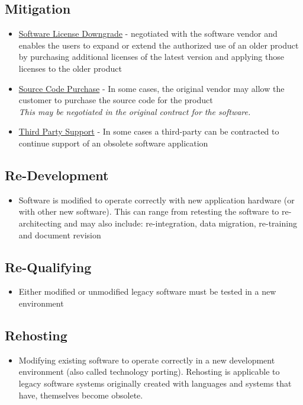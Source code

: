 \documentclass{report}
\begin{document}
		    \subsection{Mitigation}
		    	\begin{itemize}
		    		\item \underline{Software License Downgrade} - negotiated with the software vendor and enables the users to expand or extend the authorized use of an older product by purchasing additional licenses of the latest version and applying those licenses to the older product
		    		\item \underline{Source Code Purchase} - In some cases, the original vendor may allow the customer to purchase the source code for the product \\
		    		\textit{This may be negotiated in the original contract for the software.}
		    		\item \underline{Third Party Support} - In some cases a third-party can be contracted to continue support of an obsolete software application
		    	\end{itemize}
		    \subsection{Re-Development}
		    	\begin{itemize}
		    		\item Software is modified to operate correctly with new application hardware (or with other new software). This can range from retesting the software to re-architecting and may also include: re-integration, data migration, re-training and document revision
		    	\end{itemize}
		    \subsection{Re-Qualifying}
		    	\begin{itemize}
		    		\item Either modified or unmodified legacy software must be tested in a new environment
		    	\end{itemize}
		    \subsection{Rehosting}
		    	\begin{itemize}
		    		\item Modifying existing software to operate correctly in a new development environment (also called technology porting). Rehosting is applicable to legacy software systems originally created with languages and systems that have, themselves become obsolete.
		    	\end{itemize}
\end{document}

